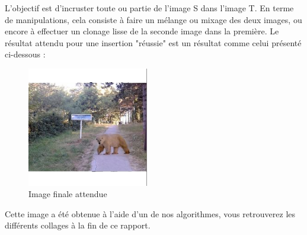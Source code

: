 L'objectif est d'incruster toute ou partie de l'image S dans l'image T. En terme de manipulations, cela consiste à faire un mélange ou mixage des deux images, ou encore à effectuer un clonage lisse de la seconde image dans la première. Le résultat attendu pour une insertion "réussie" est un résultat comme celui présenté ci-dessous : 
    
\begin{center}
\begin{figure}[!htb]
   \centering
     \includegraphics[width = 150pt]{Annexe/OursD.png}
     \caption{Image  finale attendue}
\end{figure}
\end{center}
Cette image a été obtenue à l'aide d'un de nos algorithmes, vous retrouverez les différents collages à la fin de ce rapport.\newline

